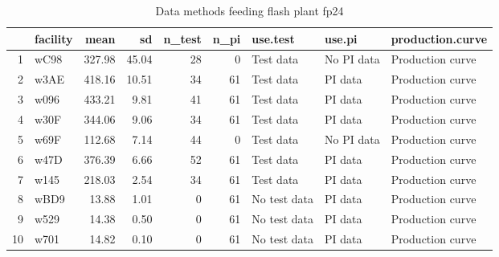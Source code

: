 \begin{table}[H]
\centering
\begin{tabular}{rlrrrrlll}
  \hline
 & facility & mean & sd & n\_test & n\_pi & use.test & use.pi & production.curve \\ 
  \hline
1 & wC98 & 327.98 & 45.04 &  28 &   0 & Test data & No PI data & Production curve \\ 
  2 & w3AE & 418.16 & 10.51 &  34 &  61 & Test data & PI data & Production curve \\ 
  3 & w096 & 433.21 & 9.81 &  41 &  61 & Test data & PI data & Production curve \\ 
  4 & w30F & 344.06 & 9.06 &  34 &  61 & Test data & PI data & Production curve \\ 
  5 & w69F & 112.68 & 7.14 &  44 &   0 & Test data & No PI data & Production curve \\ 
  6 & w47D & 376.39 & 6.66 &  52 &  61 & Test data & PI data & Production curve \\ 
  7 & w145 & 218.03 & 2.54 &  34 &  61 & Test data & PI data & Production curve \\ 
  8 & wBD9 & 13.88 & 1.01 &   0 &  61 & No test data & PI data & Production curve \\ 
  9 & w529 & 14.38 & 0.50 &   0 &  61 & No test data & PI data & Production curve \\ 
  10 & w701 & 14.82 & 0.10 &   0 &  61 & No test data & PI data & Production curve \\ 
   \hline
\end{tabular}
\caption{Data methods feeding flash plant fp24} 
\label{tab:well_summaries_fp14}
\end{table}
